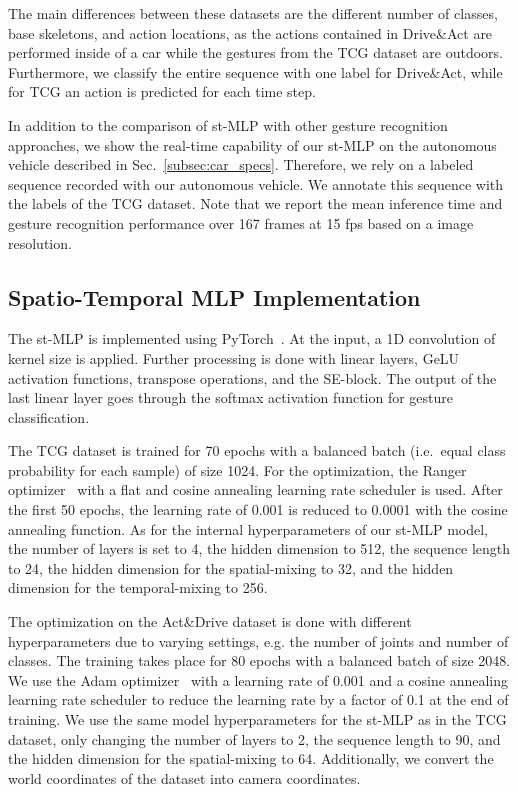 \documentclass[letterpaper, 10 pt, conference]{ieeeconf}
\begin{document}
The main differences between these datasets are the different number of classes, base skeletons, and action locations, as the actions contained in Drive\&Act are performed inside of a car while the gestures from the TCG dataset are outdoors. Furthermore, we classify the entire sequence with one label for Drive\&Act, while for TCG an action is predicted for each time step.

In addition to the comparison of st-MLP with other gesture recognition approaches, we show the real-time capability of our st-MLP on the autonomous vehicle described in Sec.~\ref{subsec:car_specs}. Therefore, we rely on a labeled sequence recorded with our autonomous vehicle. We annotate this sequence with the labels of the TCG dataset. Note that we report the mean inference time and gesture recognition performance over 167 frames at 15 fps based on a  image resolution.

\subsection{Spatio-Temporal MLP Implementation}
\label{subsec:st_mlp}
The st-MLP is implemented using PyTorch~\cite{pytorch}. At the input, a 1D convolution of kernel size  is applied. Further processing is done with linear layers, GeLU activation functions, transpose operations, and the SE-block. The output of the last linear layer goes through the softmax activation function for gesture classification.

The TCG dataset is trained for 70 epochs with a balanced batch (i.e.~equal class probability for each sample) of size 1024. For the optimization, the Ranger optimizer~\cite{Ranger} with a flat and cosine annealing learning rate scheduler is used. After the first 50 epochs, the learning rate of 0.001 is reduced to 0.0001 with the cosine annealing function. As for the internal hyperparameters of our st-MLP model, the number of layers  is set to 4, the hidden dimension  to 512, the sequence length  to 24, the hidden dimension for the spatial-mixing  to 32, and the hidden dimension for the temporal-mixing  to 256. 

The optimization on the Act\&Drive dataset is done with different hyperparameters due to varying settings, e.g. the number of joints and number of classes. The training takes place for 80 epochs with a balanced batch of size 2048. We use the Adam optimizer~\cite{kingma2014adam} with a learning rate of 0.001 and a cosine annealing learning rate scheduler to reduce the learning rate by a factor of 0.1 at the end of training. We use the same model hyperparameters for the st-MLP as in the TCG dataset, only changing the number of layers  to 2, the sequence length  to 90, and the hidden dimension for the spatial-mixing  to 64. Additionally, we convert the world coordinates of the dataset into camera coordinates.
\end{document}
